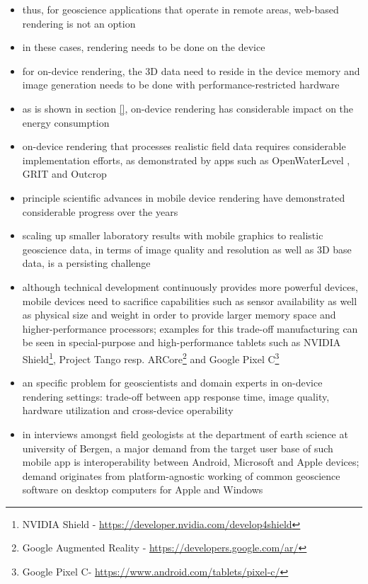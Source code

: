\documentclass[review]{elsarticle}
\begin{document}
\begin{itemize}
\item thus, for geoscience applications that operate in remote areas, web-based rendering is not an option
\item in these cases, rendering needs to be done on the device
\item for on-device rendering, the 3D data need to reside in the device memory and image generation needs to be done with performance-restricted hardware
\item as is shown in section \ref{}, on-device rendering has considerable impact on the energy consumption
\item on-device rendering that processes realistic field data requires considerable implementation efforts, as demonstrated by apps such as OpenWaterLevel \cite{}, GRIT \cite{Kehl2016_VGCabstract} and Outcrop \cite{Viseur2014_VGCabstract}
\item principle scientific advances in mobile device rendering have demonstrated considerable progress over the years \cite{Garcia2015,Kehl2015c,Agus2017}
\item scaling up smaller laboratory results with mobile graphics to realistic geoscience data, in terms of image quality and resolution as well as 3D base data, is a persisting challenge
\item although technical development continuously provides more powerful devices, mobile devices need to sacrifice capabilities such as sensor availability as well as physical size and weight in order to provide larger memory space and higher-performance processors; examples for this trade-off manufacturing can be seen in special-purpose and high-performance tablets such as NVIDIA Shield\footnote{NVIDIA Shield - \url{https://developer.nvidia.com/develop4shield}}, Project Tango resp. ARCore\footnote{Google Augmented Reality - \url{https://developers.google.com/ar/}} and Google Pixel C\footnote{Google Pixel C- \url{https://www.android.com/tablets/pixel-c/}}
\item an specific problem for geoscientists and domain experts in on-device rendering settings: trade-off between app response time, image quality, hardware utilization and cross-device operability
\item in interviews amongst field geologists at the department of earth science at university of Bergen, a major demand from the target user base of such mobile app is interoperability between Android, Microsoft and Apple devices; demand originates from platform-agnostic working of common geoscience software on desktop computers for Apple and Windows

\end{itemize}
\end{document}
